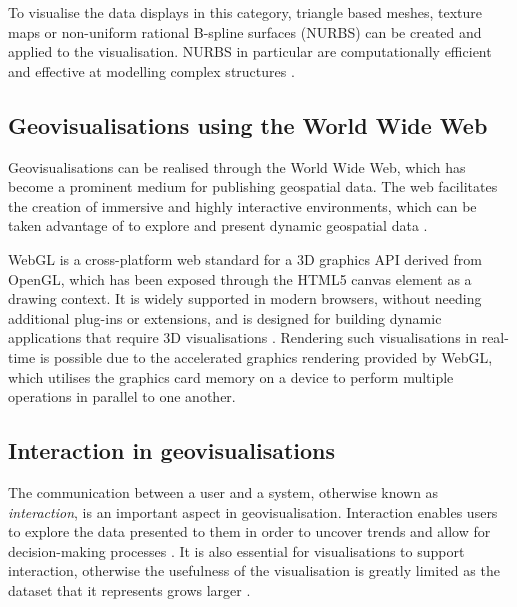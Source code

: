 \documentclass[
	fontsize=11pt
	headlines=2,
	footlines=2,
	parskip=half
]{scrartcl}
\begin{document}
{{			To visualise the data displays in this category, triangle based meshes, texture maps or non-uniform rational B-spline surfaces (NURBS) can be created and applied to the visualisation. NURBS in particular are computationally efficient and effective at modelling complex structures \parencite{hildebrandt2011image, zhong2006enhanced}.

		}

		\subsection{Geovisualisations using the World Wide Web} {

			Geovisualisations can be realised through the World Wide Web, which has become a prominent medium for publishing geospatial data. The web facilitates the creation of immersive and highly interactive environments, which can be taken advantage of to explore and present dynamic geospatial data \parencite{maceachren2001research}.

			WebGL is a cross-platform web standard for a 3D graphics API derived from OpenGL, which has been exposed through the HTML5 canvas element \parencite{marrin2011webgl} as a drawing context. It is widely supported in modern browsers, without needing additional plug-ins or extensions, and is designed for building dynamic applications that require 3D visualisations \parencite{chaturvedi2015web, marrin2011webgl, parisi2012webgl}. Rendering such visualisations in real-time is possible due to the accelerated graphics rendering provided by WebGL, which utilises the graphics card memory on a device \parencite{chaturvedi2015web} to perform multiple operations in parallel to one another.

		}

		\subsection{Interaction in geovisualisations} {

			The communication between a user and a system, otherwise known as \emph{interaction}, is an important aspect in geovisualisation. Interaction enables users to explore the data presented to them in order to uncover trends and allow for decision-making processes \parencite{yi2007toward}. It is also essential for visualisations to support interaction, otherwise the usefulness of the visualisation is greatly limited as the dataset that it represents grows larger \parencite{yi2007toward}.

}}
\end{document}
